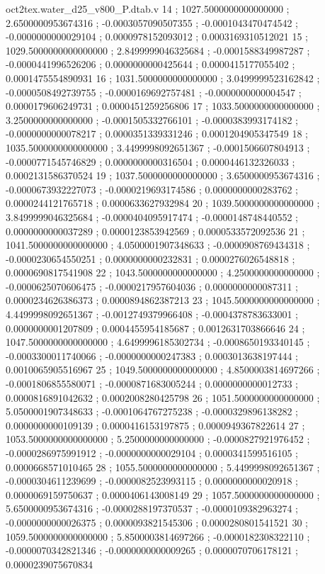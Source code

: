 \begin{filecontents}[overwrite]{oct2tex.water_d25_v800_P.dtab.v}
14 ; 1027.5000000000000000 ; 2.6500000953674316 ; -0.0003057090507355 ; -0.0001043470474542 ; -0.0000000000029104 ; 0.0000978152093012 ; 0.0003169310512021
15 ; 1029.5000000000000000 ; 2.8499999046325684 ; -0.0001588349987287 ; -0.0000441996526206 ; 0.0000000000425644 ; 0.0000415177055402 ; 0.0001475554890931
16 ; 1031.5000000000000000 ; 3.0499999523162842 ; -0.0000508492739755 ; -0.0000169692757481 ; -0.0000000000004547 ; 0.0000179606249731 ; 0.0000451259256806
17 ; 1033.5000000000000000 ; 3.2500000000000000 ; -0.0001505332766101 ; -0.0000383993174182 ; -0.0000000000078217 ; 0.0000351339331246 ; 0.0001204905347549
18 ; 1035.5000000000000000 ; 3.4499998092651367 ; -0.0001506607804913 ; -0.0000771545746829 ; 0.0000000000316504 ; 0.0000446132326033 ; 0.0002131586370524
19 ; 1037.5000000000000000 ; 3.6500000953674316 ; -0.0000673932227073 ; -0.0000219693174586 ; 0.0000000000283762 ; 0.0000244121765718 ; 0.0000633627932984
20 ; 1039.5000000000000000 ; 3.8499999046325684 ; -0.0000404095917474 ; -0.0000148748440552 ; 0.0000000000037289 ; 0.0000123853942569 ; 0.0000533572092536
21 ; 1041.5000000000000000 ; 4.0500001907348633 ; -0.0000908769434318 ; -0.0000230654550251 ; 0.0000000000232831 ; 0.0000276026548818 ; 0.0000690817541908
22 ; 1043.5000000000000000 ; 4.2500000000000000 ; -0.0000625070606475 ; -0.0000217957604036 ; 0.0000000000087311 ; 0.0000234626386373 ; 0.0000894862387213
23 ; 1045.5000000000000000 ; 4.4499998092651367 ; -0.0012749379966408 ; -0.0004378783633001 ; 0.0000000001207809 ; 0.0004455954185687 ; 0.0012631703866646
24 ; 1047.5000000000000000 ; 4.6499996185302734 ; -0.0008650193340145 ; -0.0003300011740066 ; -0.0000000000247383 ; 0.0003013638197444 ; 0.0010065905516967
25 ; 1049.5000000000000000 ; 4.8500003814697266 ; -0.0001806855580071 ; -0.0000871683005244 ; 0.0000000000012733 ; 0.0000816891042632 ; 0.0002008280425798
26 ; 1051.5000000000000000 ; 5.0500001907348633 ; -0.0001064767275238 ; -0.0000329896138282 ; 0.0000000000109139 ; 0.0000416153197875 ; 0.0000949367822614
27 ; 1053.5000000000000000 ; 5.2500000000000000 ; -0.0000827921976452 ; -0.0000286975991912 ; -0.0000000000029104 ; 0.0000341599516105 ; 0.0000668571010465
28 ; 1055.5000000000000000 ; 5.4499998092651367 ; -0.0000304611239699 ; -0.0000082523993115 ; 0.0000000000020918 ; 0.0000069159750637 ; 0.0000406143008149
29 ; 1057.5000000000000000 ; 5.6500000953674316 ; -0.0000288197370537 ; -0.0000109382963274 ; -0.0000000000026375 ; 0.0000093821545306 ; 0.0000280801541521
30 ; 1059.5000000000000000 ; 5.8500003814697266 ; -0.0000182308322110 ; -0.0000070342821346 ; -0.0000000000009265 ; 0.0000070706178121 ; 0.0000239075670834

\end{filecontents}
